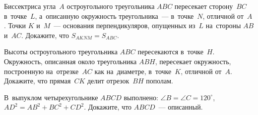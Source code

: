 


\begin{problems}



\item
Биссектриса угла~$A$ остроугольного треугольника $ABC$ пересекает сторону~$BC$
в~точке~$L$, а~описанную окружность треугольника~--- в~точке~$N$, отличной
от~$A$.
Точки $K$ и~$M$~--- основания перпендикуляров, опущенных из~$L$
на~стороны $AB$ и~$AC$.
Докажите, что $S_{AKNM} = S_{ABC}$.



\item
Высоты остроугольного треугольника $ABC$ пересекаются в~точке~$H$.
Окружность, описанная около треугольника $ABH$, пересекает окружность,
построенную на~отрезке~$AC$ как на~диаметре, в~точке~$K$, отличной от~$A$.
Докажите, что прямая~$CK$ делит отрезок~$BH$ пополам.

\item
В~выпуклом четырехугольнике $ABCD$ выполнено:
$\angle B = \angle C = 120^{\circ}$, $AD^2 = AB^2 + BC^2 + CD^2$.
Докажите, что $ABCD$~--- описанный.


\end{problems}
